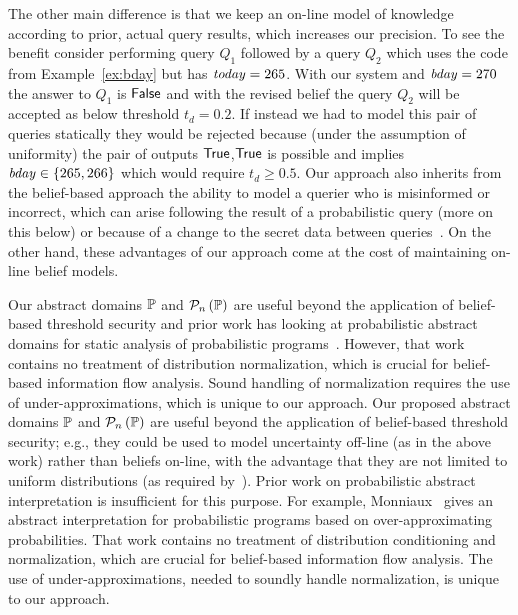 The other main difference is that we keep an
on-line model of knowledge according to prior, actual query results,
which increases our precision.  To see the benefit consider performing
query $Q_1$ followed by a query $Q_2$ which uses the code from
Example~\ref{ex:bday} but has $\mathit{today} = 265$.  With our system
and $\mathit{bday} = 270$ the 
answer to $Q_1$ is $\mathsf{False}$ and with the revised belief the query $Q_2$
will be accepted as below threshold $t_d = 0.2$.  If instead we had to
model this pair of queries statically they would be rejected because
(under the assumption of uniformity) the pair of outputs
$\mathsf{True}$,$\mathsf{True}$ is possible and implies $\mathit{bday} \in \{ 265, 266
\}$ which would require $t_d \geq 0.5$.  Our approach also inherits
from the belief-based approach the ability to model a querier who is
misinformed or incorrect, which can arise following the result of a
probabilistic query (more on this below) or because of a change to the
secret data between queries~\cite{clarkson09quantifying}.
On the other hand, these advantages
of our approach come at the cost of maintaining on-line belief models.
\fi

\ifacita
Our abstract domains $\mathbb{P}$ and $ \mathcal{P}_{n}\left( \mathbb{P} \right) $ are useful
beyond the application of belief-based threshold security and prior
work has looking at probabilistic abstract domains for static analysis
of probabilistic programs~\cite{Monniaux_these}.  However, that work
contains no treatment of
distribution normalization, which is crucial for
belief-based information flow analysis.  Sound handling of normalization
requires the use of under-approximations, which is unique to our approach.
\else
Our proposed abstract domains $\mathbb{P}$ and $ \mathcal{P}_{n}\left( \mathbb{P} \right) $ are useful
beyond the application of belief-based threshold security; e.g., they
could be used to model uncertainty off-line (as in the above work)
rather than beliefs on-line, with the advantage that they are not
limited to uniform distributions (as required
by~\cite{backes09automatic,kopf:rybalchenko}).  Prior work on
probabilistic abstract interpretation is insufficient for this
purpose.  For example, Monniaux~\cite{Monniaux_these} gives an
abstract interpretation for probabilistic programs based on
over-approximating probabilities.  That work contains no treatment of
distribution conditioning and normalization, which are crucial for
belief-based information flow analysis.  The use of
under-approximations, needed to soundly handle 
normalization, is unique to our approach.
\fi

